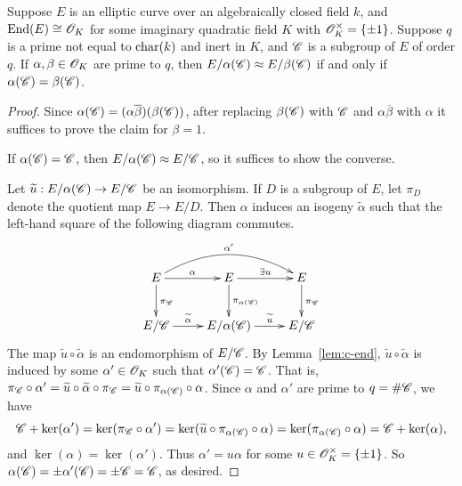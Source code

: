 \documentclass{amsart}
\begin{document}
\begin{lemma}\label{lem:c-subgps-distinct-quotients}
  Suppose $E$ is an elliptic curve over an algebraically closed field $k$, and $\operatorname{End}(E) \cong \mathscr{O}_K$ for some imaginary quadratic field $K$ with $\mathscr{O}_K^\times = \{\pm 1\}$. Suppose $q$ is a prime not equal to $\operatorname{char}(k)$ and inert in $K$, and $\mathscr{C}$ is a subgroup of $E$ of order $q$. If $\alpha,\beta \in \mathscr{O}_K$ are prime to $q$, then $E/\alpha(\mathscr{C}) \approx E/\beta(\mathscr{C})$ if and only if $\alpha(\mathscr{C}) = \beta(\mathscr{C})$.
\end{lemma}
\begin{proof}
 Since $\alpha(\mathscr{C}) = (\alpha\overline{\beta})(\beta(\mathscr{C}))$, after replacing $\beta(\mathscr{C})$ with $\mathscr{C}$ and $\alpha\overline{\beta}$ with $\alpha$ it suffices to prove the claim for $\beta = 1$.

  If $\alpha(\mathscr{C}) = \mathscr{C}$, then $E/\alpha(\mathscr{C}) \approx E/\mathscr{C}$, so it suffices to show the converse.

  Let $\widetilde{u}: E/\alpha(\mathscr{C}) \to E/\mathscr{C}$ be an isomorphism. %
If $D$ is a subgroup of $E$, let $\pi_{D}$ denote the quotient map $E \to E/D$. Then $\alpha$ induces an isogeny $\tilde{\alpha}$
such that the left-hand square of the following diagram commutes.
$$
\xymatrix{
E \ar^{\alpha}[r]  \ar^{\pi_\sC}[d] \ar@/^1.6pc/^{\alpha'}[rr] & E \ar^{\exists u}[r]  \ar^{\pi_{\alpha(\sC)}}[d] & E \ar^{\pi_\sC}[d] \\
E/\sC \ar^-{\tilde{\alpha}}[r] & E/\alpha(\sC) \ar^-{\tilde{u}}[r] & E/\sC
}
$$
The map $\tilde{u}\circ\tilde{\alpha}$ is an endomorphism of $E/\mathscr{C}$. By Lemma~\ref{lem:c-end}, $\tilde{u}\circ\tilde{\alpha}$ is induced by some $\alpha' \in \mathscr{O}_K$ such that $\alpha'(\mathscr{C}) = \mathscr{C}$. That is, $\pi_{\mathscr{C}}\circ\alpha' = \widetilde{u}\circ\widetilde{\alpha}\circ\pi_{\mathscr{C}} = \widetilde{u}\circ\pi_{\alpha(\mathscr{C})}\circ\alpha$.
  Since $\alpha$ and $\alpha'$ are prime to $q = \#\mathscr{C}$, we have
  \[
    \mathscr{C} + \ker(\alpha')
    =
    \ker(\pi_{\mathscr{C}} \circ \alpha')
    =
    \ker(\widetilde{u}\circ\pi_{\alpha(\mathscr{C})}\circ\alpha)
    =
    \ker(\pi_{\alpha(\mathscr{C})}\circ\alpha)
    =
    \mathscr{C} + \ker(\alpha),
  \]
  and $\ker(\alpha) = \ker(\alpha')$. Thus $\alpha' = u\alpha$ for some $u \in \mathscr{O}_K^\times = \{\pm 1\}$. So $\alpha(\mathscr{C}) = \pm\alpha'(\mathscr{C}) = \pm\mathscr{C} = \mathscr{C}$, as desired.

\end{proof}
\end{document}
